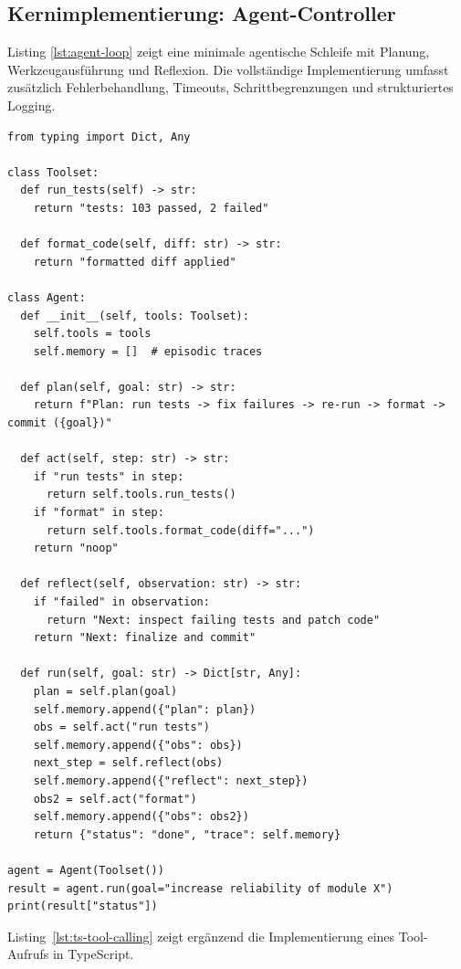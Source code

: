 \subsection{Kernimplementierung: Agent-Controller}

Listing \ref{lst:agent-loop} zeigt eine minimale agentische Schleife mit Planung, Werkzeugausführung und Reflexion. Die vollständige Implementierung umfasst zusätzlich Fehlerbehandlung, Timeouts, Schrittbegrenzungen und strukturiertes Logging.

\begin{lstlisting}[style=Python, caption={Minimaler agentischer Loop für SE-Aufgaben (Beispiel-Listing)}, label={lst:agent-loop}]
from typing import Dict, Any

class Toolset:
  def run_tests(self) -> str:
    return "tests: 103 passed, 2 failed"

  def format_code(self, diff: str) -> str:
    return "formatted diff applied"

class Agent:
  def __init__(self, tools: Toolset):
    self.tools = tools
    self.memory = []  # episodic traces

  def plan(self, goal: str) -> str:
    return f"Plan: run tests -> fix failures -> re-run -> format -> commit ({goal})"

  def act(self, step: str) -> str:
    if "run tests" in step:
      return self.tools.run_tests()
    if "format" in step:
      return self.tools.format_code(diff="...")
    return "noop"

  def reflect(self, observation: str) -> str:
    if "failed" in observation:
      return "Next: inspect failing tests and patch code"
    return "Next: finalize and commit"

  def run(self, goal: str) -> Dict[str, Any]:
    plan = self.plan(goal)
    self.memory.append({"plan": plan})
    obs = self.act("run tests")
    self.memory.append({"obs": obs})
    next_step = self.reflect(obs)
    self.memory.append({"reflect": next_step})
    obs2 = self.act("format")
    self.memory.append({"obs": obs2})
    return {"status": "done", "trace": self.memory}

agent = Agent(Toolset())
result = agent.run(goal="increase reliability of module X")
print(result["status"])
\end{lstlisting}

Listing~\ref{lst:ts-tool-calling} zeigt ergänzend die Implementierung eines Tool-Aufrufs in TypeScript.

